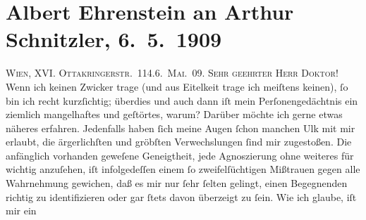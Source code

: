 

         
         \renewcommand{\erwaehntePersonen}{Personen: Maurice Donnay, Albert Ehrenstein}
         \renewcommand{\erwaehnteInstitutionen}{Institutionen: Wiener Freie Volksbühne}
         \renewcommand{\erwaehnteOrte}{Orte: Königseggasse, Lustspieltheater (Wien), Ottakringerstraße, VI., Mariahilf, Verbandsheim, Wien}
         \renewcommand{\erwaehnteWerke}{Werke: Lysistrata}
               \section[Albert Ehrenstein an Arthur Schnitzler, 6. 5. 1909]{ Albert Ehrenstein an Arthur Schnitzler, 6. 5. 1909}\nopagebreak{}\rehead{ }\begin{ledgroupsized}[t]{13cm}\normalsize\beginnumbering{} \toendnotes[C]{\smallbreak\pagebreak[2]} 
\toendnotes[C]{\smallbreak}\pstart
           {\pb}\textsc{Wien, XVI. Ottakringerstr. 114}.\hfill \textsc{6. Mai. 09}.\pend
           \pstart{}\textsc{Sehr geehrter Herr Doktor!}\pend\pstart
           Wenn ich keinen Zwicker trage (und aus Eitelkeit trage ich meiſtens keinen), ſo bin
               ich recht kurzſichtig; überdies und auch dann iſt mein Perſonengedächtnis ein
               ziemlich mangelhaftes und geſtörtes, warum? Darüber möchte ich gerne etwas näheres
               erfahren. Jedenfalls haben ſich meine Augen ſchon manchen Ulk mit mir erlaubt, die
               ärgerlichſten und gröbſten Verwechslungen ſind mir zugestoßen. Die anfänglich
               vorhanden geweſene Geneigtheit, jede Agnoszierung ohne weiteres für wichtig
               anzuſehen, iſt infolgedeſſen einem ſo zweifelſüchtigen Mißtrauen gegen alle
               Wahrnehmung gewichen, daß es mir nur ſehr ſelten gelingt, einen Begegnenden richtig
               zu identifizieren oder gar ſtets davon überzeigt zu ſein. Wie ich glaube, iſt mir ein

\end{ledgroupsized}
